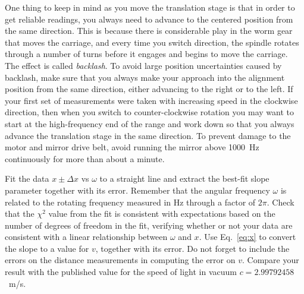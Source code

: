 \documentclass{revtex4}
\begin{document}
One thing to keep in mind as you move the translation stage is that in
order to get reliable readings, you always need to advance to the centered
position from the same direction.  This is because there is considerable
play in the worm gear that moves the carriage, and every time you switch
direction, the spindle rotates through a number of turns before it
engages and begins to move the carriage.  The effect is called {\em backlash}.
To avoid large position uncertainties caused by backlash, make sure that
you always make your approach into the alignment position from the
same direction, either advancing to the right or to the left.  If your
first set of measurements were taken with increasing speed in the clockwise
direction, then when you switch to counter-clockwise rotation you may want
to start at the high-frequency end of the range and work down so that you
always advance the translation stage in the same direction.  To prevent
damage to the motor and mirror drive belt, avoid running the mirror above
1000~Hz continuously for more than about a minute.

Fit the data $x\pm \Delta x$ vs $\omega$ to a straight line and
extract the best-fit slope parameter together with its error.  Remember
that the angular frequency $\omega$ is related to the rotating frequency
measured in Hz through a factor of $2\pi$.  Check
that the $\chi^2$ value from the fit is consistent with expectations
based on the number of degrees of freedom in the fit, verifying whether
or not your data are consistent with a linear relationship between $\omega$
and $x$.
Use Eq.~\ref{eq:x} to convert the slope to a value for $v$, together with
its error.  Do not forget to include the errors on the distance measurements
in computing the error on $v$.  Compare your result with the published
value for the speed of light in vacuum $c=2.99792458$~m/s.

\end{document}

